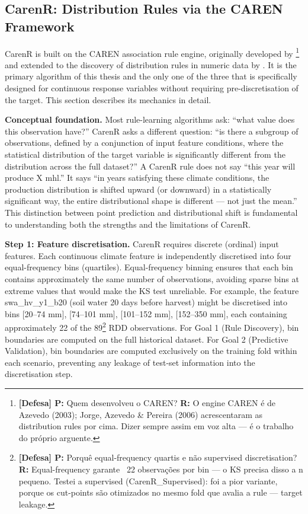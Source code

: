 \subsection{CarenR: Distribution Rules via the CAREN Framework}\label{sub:carenr_distribution_rules_via}

CarenR is built on the CAREN association rule engine, originally developed by \footnote{\textbf{[Defesa] P:} Quem desenvolveu o CAREN? \textbf{R:} O engine CAREN é de Azevedo (2003); Jorge, Azevedo \& Pereira (2006) acrescentaram as distribution rules por cima. Dizer sempre assim em voz alta --- é o trabalho do próprio arguente.} and extended to the discovery of distribution rules in numeric data by \citet{Jorge2006}. It is the primary algorithm of this thesis and the only one of the three that is specifically designed for continuous response variables without requiring pre-discretisation of the target. This section describes its mechanics in detail.

\textbf{Conceptual foundation. }Most rule-learning algorithms ask: ``what value does this observation have?'' CarenR asks a different question: ``is there a subgroup of observations, defined by a conjunction of input feature conditions, where the statistical distribution of the target variable is significantly different from the distribution across the full dataset?'' A CarenR rule does not say ``this year will produce X mhl.'' It says ``in years satisfying these climate conditions, the production distribution is shifted upward (or downward) in a statistically significant way, the entire distributional shape is different --- not just the mean.'' This distinction between point prediction and distributional shift is fundamental to understanding both the strengths and the limitations of CarenR.

\textbf{Step 1: Feature discretisation. }CarenR requires discrete (ordinal) input features. Each continuous climate feature is independently discretised into four equal-frequency bins (quartiles). Equal-frequency binning ensures that each bin contains approximately the same number of observations, avoiding sparse bins at extreme values that would make the KS test unreliable. For example, the feature swa\_hv\_y1\_b20 (soil water 20 days before harvest) might be discretised into bins [20--74 mm], [74--101 mm], [101--152 mm], [152--350 mm], each containing approximately 22 of the 89\footnote{\textbf{[Defesa] P:} Porquê equal-frequency quartis e não supervised discretisation? \textbf{R:} Equal-frequency garante ~22 observações por bin --- o KS precisa disso a n pequeno. Testei a supervised (CarenR\_Supervised): foi a pior variante, porque os cut-points são otimizados no mesmo fold que avalia a rule --- target leakage.} RDD observations. For Goal 1 (Rule Discovery), bin boundaries are computed on the full historical dataset. For Goal 2 (Predictive Validation), bin boundaries are computed exclusively on the training fold within each scenario, preventing any leakage of test-set information into the discretisation step.

